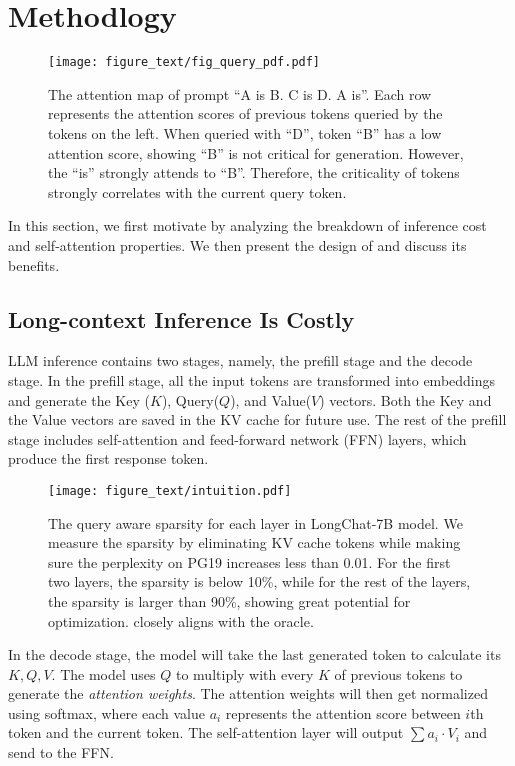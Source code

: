 \section{Methodlogy}
\begin{figure}[t]
    \centering
     \texttt{[image: figure\_text/fig\_query\_pdf.pdf]}
    \caption{The attention map of prompt ``A is B. C is D. A is''. Each row represents the attention scores of previous tokens queried by the tokens on the left. When queried with ``D'', token ``B'' has a low attention score, showing ``B'' is not critical for generation. However, the ``is'' strongly attends to ``B''. Therefore, the criticality of tokens strongly correlates with the current query token.}
    \label{fig:query}
\vspace{-0.1in}
\end{figure}

In this section, we first motivate \method by analyzing the breakdown of inference cost and self-attention properties. We then present the design of \method and discuss its benefits.

\subsection{Long-context Inference Is Costly}

LLM inference contains two stages, namely, the prefill stage and the decode stage. In the prefill stage, all the input tokens are transformed into embeddings and generate the Key ($K$), Query($Q$), and Value($V$) vectors. Both the Key and the Value vectors are saved in the KV cache for future use. The rest of the prefill stage includes self-attention and feed-forward network (FFN) layers, which produce the first response token. 

\begin{figure}
    \centering
     \texttt{[image: figure\_text/intuition.pdf]}
    \caption{The query aware sparsity for each layer in LongChat-7B model. We measure the sparsity by eliminating KV cache tokens while making sure the perplexity on PG19 increases less than 0.01. For the first two layers, the sparsity is below 10\%, while for the rest of the layers, the sparsity is larger than 90\%, showing great potential for optimization. \method closely aligns with the oracle. }
    \label{fig:qa-sparsity}
\end{figure}

In the decode stage, the model will take the last generated token to calculate its $K,Q,V$. The model uses $Q$ to multiply with every $K$ of previous tokens to generate the \textit{attention weights}. The attention weights will then get normalized using softmax, where each value $a_i$ represents the attention score between $i$th token and the current token. The self-attention layer will output $\sum a_i \cdot V_i$ and send to the FFN.

